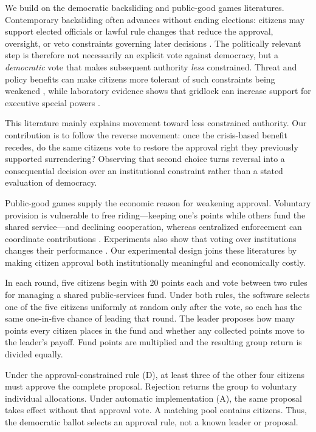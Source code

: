\documentclass[11pt,a4paper]{article}
\newcommand{\Dproc}{\textsf{D}}
\newcommand{\Aproc}{\textsf{A}}
\begin{document}
We build on the democratic backsliding and public-good games literatures. Contemporary backsliding often advances without ending elections: citizens may support elected officials or lawful rule changes that reduce the approval, oversight, or veto constraints governing later decisions \parencite{Bermeo2016}. The politically relevant step is therefore not necessarily an explicit vote against democracy, but a \emph{democratic} vote that makes subsequent authority \emph{less} constrained. Threat and policy benefits can make citizens more tolerant of such constraints being weakened \parencites{HetheringtonSuhay2011}{Goodman2021}{0b3bf}, while laboratory evidence shows that gridlock can increase support for executive special powers \parencite{FortezaMussioPereyra2024}.

This literature mainly explains movement toward less constrained authority. Our contribution is to follow the reverse movement: once the crisis-based benefit recedes, do the same citizens vote to restore the approval right they previously supported surrendering? Observing that second choice turns reversal into a consequential decision over an institutional constraint rather than a stated evaluation of democracy.

Public-good games supply the economic reason for weakening approval. Voluntary provision is vulnerable to free riding---keeping one's points while others fund the shared service---and declining cooperation, whereas centralized enforcement can coordinate contributions \parencites{FehrGachter2000,FischbacherGachter2010,Hamman2011}. Experiments also show that voting over institutions changes their performance \parencites{DalBo2010,SutterHaignerKocher2010,MarkussenPuttermanTyran2014}. Our experimental design joins these literatures by making citizen approval both institutionally meaningful and economically costly.

In each round, five citizens begin with 20 points each and vote between two rules for managing a shared public-services fund. Under both rules, the software selects one of the five citizens uniformly at random only after the vote, so each has the same one-in-five chance of leading that round. The leader proposes how many points every citizen places in the fund and whether any collected points move to the leader's payoff. Fund points are multiplied and the resulting group return is divided equally.

Under the approval-constrained rule (\Dproc), at least three of the other four citizens must approve the complete proposal. Rejection returns the group to voluntary individual allocations. Under automatic implementation (\Aproc), the same proposal takes effect without that approval vote. A matching pool contains  citizens. Thus, the democratic ballot selects an approval rule, not a known leader or proposal.
\end{document}

